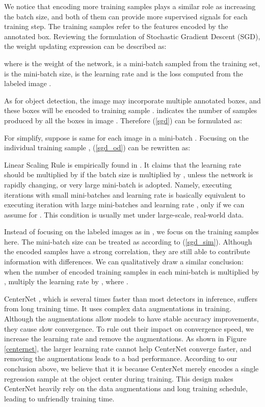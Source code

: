 \documentclass[letterpaper]{article} \usepackage{aaai20}  \usepackage{times}  \usepackage{helvet} \usepackage{courier}  \usepackage[hyphens]{url}  \usepackage{graphicx} \urlstyle{rm} \def\UrlFont{\rm}  \usepackage{graphicx}  \frenchspacing  \setlength{\pdfpagewidth}{8.5in}  \setlength{\pdfpageheight}{11in}  \usepackage{subcaption}
\begin{document}
We notice that encoding more training samples plays a similar role as increasing the batch size, and both of them can provide more supervised signals for each training step. The training samples refer to the features encoded by the annotated box. Reviewing the formulation of Stochastic Gradient Descent (SGD), the weight updating expression can be described as:



\noindent where  is the weight of the network,  is a mini-batch sampled from the training set,  is the mini-batch size,  is the learning rate and  is the loss computed from the labeled image .

As for object detection, the image  may incorporate multiple annotated boxes, and these boxes will be encoded to training sample .  indicates the number of samples produced by all the boxes in image . Therefore (\ref{sgd}) can be formulated as:



For simplify, suppose  is same for each image  in a mini-batch . Focusing on the individual training sample , (\ref{sgd_od}) can be rewritten as:



Linear Scaling Rule is empirically found in \cite{DBLP:journals/corr/GoyalDGNWKTJH17}. It claims that the learning rate should be multiplied by  if the batch size is multiplied by , unless the network is rapidly changing, or very large mini-batch is adopted. Namely, executing  iterations with small mini-batches  and learning rate  is basically equivalent to executing  iteration with large mini-batches  and learning rate , only if we can assume  for . This condition is usually met under large-scale, real-world data.

Instead of focusing on the labeled images  as in \cite{DBLP:journals/corr/GoyalDGNWKTJH17}, we focus on the training samples  here. The mini-batch size can be treated as  according to (\ref{sgd_sim}). Although the encoded samples  have a strong correlation, they are still able to contribute information with differences. We can qualitatively draw a similar conclusion: when the number of encoded training samples in each mini-batch is multiplied by , multiply the learning rate by , where . 

CenterNet \cite{DBLP:journals/corr/abs-1904-07850}, which is several times faster than most detectors in inference, suffers from long training time. It uses complex data augmentations in training. Although the augmentations allow models to have stable accuracy improvements, they cause slow convergence. To rule out their impact on convergence speed, we increase the learning rate and remove the augmentations. As shown in Figure \ref{centernet}, the larger learning rate cannot help CenterNet converge faster, and removing the augmentations leads to a bad performance. According to our conclusion above, we believe that it is because CenterNet merely encodes a single regression sample at the object center during training. This design makes CenterNet heavily rely on the data augmentations and long training schedule, leading to unfriendly training time.
\end{document}
